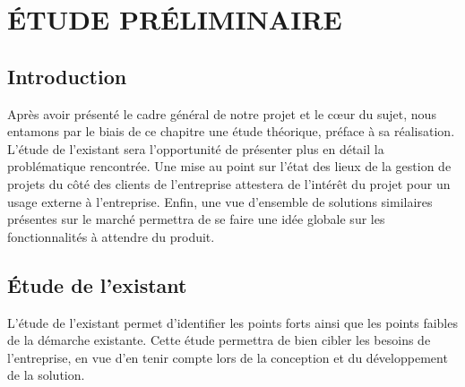 \setcounter{chapter}{1}
\chapter{ÉTUDE PRÉLIMINAIRE}
\minitoc %
\graphicspath{{Chapitre2/figures/}}


\pagestyle{fancy}
\fancyhf{}
\fancyhead[R]{\bfseries\rightmark}
\fancyfoot[R]{\thepage}
\renewcommand{\headrulewidth}{0.5pt}
\renewcommand{\footrulewidth}{0pt}
\renewcommand{\chaptermark}[1]{\markboth{\MakeUppercase{\chaptername~\thechapter. #1 }}{}}
\renewcommand{\sectionmark}[1]{\markright{\thechapter.\thesection~ #1}}

\begin{spacing}{1.5}

\section*{Introduction}
Après avoir présenté le cadre général de notre projet et le cœur du sujet, nous entamons par le biais de ce chapitre une étude théorique, préface à sa réalisation. L'étude de l'existant sera l'opportunité de présenter plus en détail la problématique rencontrée. Une mise au point sur l'état des lieux de la gestion de projets du côté des clients de l'entreprise attestera de l'intérêt du projet pour un usage externe à l'entreprise. Enfin, une vue d'ensemble de solutions similaires présentes sur le marché permettra de se faire une idée globale sur les fonctionnalités à attendre du produit.

\section{Étude de l'existant}
L'étude de l'existant permet d'identifier les points forts ainsi que les points faibles de la démarche existante. Cette étude permettra de bien cibler les besoins de l'entreprise, en vue d'en tenir compte lors de la conception et du développement de la solution.

\end{spacing}
